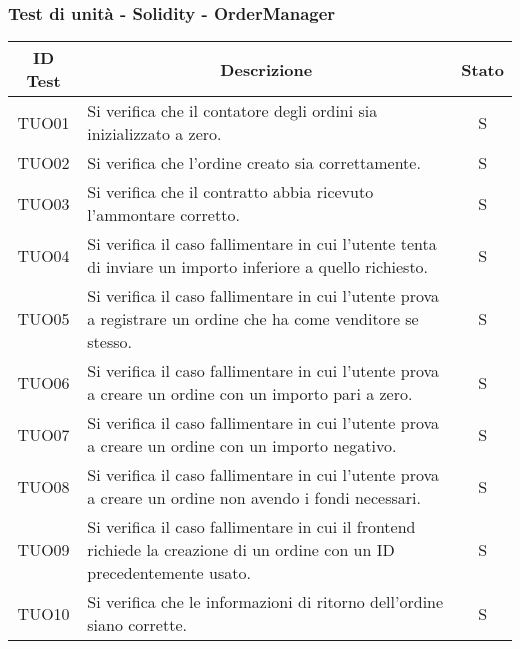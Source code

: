 \subsubsection{Test di unità - Solidity - OrderManager}\label{subsubsection:TUO}
\begin{table}[H]
  \centering
  \renewcommand{\arraystretch}{1.8}
  \begin{tabular}{c|p{10cm}|c}
    \rowcolor[HTML]{125E28}
    \color[HTML]{FFFFFF}\textbf{ID Test}
          & \multicolumn{1}{c}{\color[HTML]{FFFFFF}\textbf{Descrizione}}
          & \color[HTML]{FFFFFF}\textbf{Stato}                                                                                                    \\
    \hline
    TUO01 & Si verifica che il contatore degli ordini sia inizializzato a zero.                                                               & S \\
    TUO02 & Si verifica che l'ordine creato sia correttamente.                                                                                & S \\
    TUO03 & Si verifica che il contratto abbia ricevuto l'ammontare corretto.                                                                 & S \\
    TUO04 & Si verifica il caso fallimentare in cui l'utente tenta di inviare un importo inferiore a quello richiesto.                        & S \\
    TUO05 & Si verifica il caso fallimentare in cui l'utente prova a registrare un ordine che ha come venditore se stesso.                    & S \\
    TUO06 & Si verifica il caso fallimentare in cui l'utente prova a creare un ordine con un importo pari a zero.                             & S \\
    TUO07 & Si verifica il caso fallimentare in cui l'utente prova a creare un ordine con un importo negativo.                                & S \\
    TUO08 & Si verifica il caso fallimentare in cui l'utente prova a creare un ordine non avendo i fondi necessari.                           & S \\
    TUO09 & Si verifica il caso fallimentare in cui il frontend\glo{} richiede la creazione di un ordine con un ID precedentemente usato.     & S \\
    TUO10 & Si verifica che le informazioni di ritorno dell'ordine siano corrette.                                                            & S \\

\end{tabular}
\end{table}
